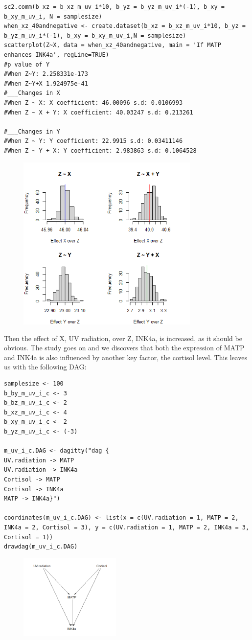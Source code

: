 \documentclass{article}
\begin{document}
\begin{lstlisting}
sc2.comm(b_xz = b_xz_m_uv_i*10, b_yz = b_yz_m_uv_i*(-1), b_xy = b_xy_m_uv_i, N = samplesize)
when_xz_40andnegative <- create.dataset(b_xz = b_xz_m_uv_i*10, b_yz = b_yz_m_uv_i*(-1), b_xy = b_xy_m_uv_i,N = samplesize)
scatterplot(Z~X, data = when_xz_40andnegative, main = 'If MATP enhances INK4a', regLine=TRUE)
#p value of Y
#When Z~Y: 2.258331e-173
#When Z~Y+X 1.924975e-41 
#___Changes in X
#When Z ~ X: X coefficient: 46.00096 s.d: 0.0106993
#When Z ~ X + Y: X coefficient: 40.03247 s.d: 0.213261

#___Changes in Y
#When Z ~ Y: Y coefficient: 22.9915 s.d: 0.03411146
#When Z ~ Y + X: Y coefficient: 2.983863 s.d: 0.1064528
\end{lstlisting}

\begin{figure}[h]
\includegraphics[width=9cm]{hist40neg.png}
\centering
\end{figure}
\newpage
Then the effect of X, UV radiation, over Z, INK4a, is increased, as it should be obvious. 
The study goes on and we discovers that both the expression of MATP and INK4a is also influenced by another key factor, the cortisol level. This leaves us with the following DAG:

\begin{lstlisting}
samplesize <- 100
b_by_m_uv_i_c <- 3
b_bz_m_uv_i_c <- 2
b_xz_m_uv_i_c <- 4
b_xy_m_uv_i_c <- 2
b_yz_m_uv_i_c <- (-3)

m_uv_i_c.DAG <- dagitty("dag {
UV.radiation -> MATP
UV.radiation -> INK4a
Cortisol -> MATP
Cortisol -> INK4a
MATP -> INK4a}")

coordinates(m_uv_i_c.DAG) <- list(x = c(UV.radiation = 1, MATP = 2, INK4a = 2, Cortisol = 3), y = c(UV.radiation = 1, MATP = 2, INK4a = 3, Cortisol = 1))
drawdag(m_uv_i_c.DAG)
\end{lstlisting}
\begin{figure}[h]
\includegraphics[width=5cm]{mUVicor.png}
\centering
\end{figure}
\end{document}
